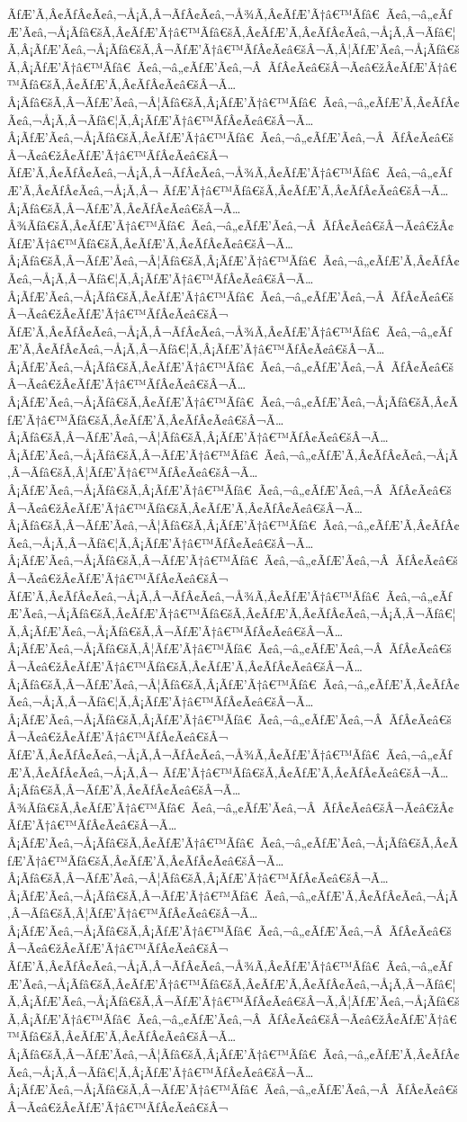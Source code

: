 \documentclass{gemoc} %
\begin{document}
ÃƒÆ’Ã‚Â¢ÃƒÂ¢Ã¢â‚¬Å¡Ã‚Â¬ÃƒÂ¢Ã¢â‚¬Å¾Ã‚Â¢ÃƒÆ’Ã†â€™Ãƒâ€ Ã¢â‚¬â„¢ÃƒÆ’Ã¢â‚¬Å¡Ãƒâ€šÃ‚Â¢ÃƒÆ’Ã†â€™Ãƒâ€šÃ‚Â¢ÃƒÆ’Ã‚Â¢ÃƒÂ¢Ã¢â‚¬Å¡Ã‚Â¬Ãƒâ€¦Ã‚Â¡ÃƒÆ’Ã¢â‚¬Å¡Ãƒâ€šÃ‚Â¬ÃƒÆ’Ã†â€™ÃƒÂ¢Ã¢â€šÂ¬Ã‚Â¦ÃƒÆ’Ã¢â‚¬Å¡Ãƒâ€šÃ‚Â¡ÃƒÆ’Ã†â€™Ãƒâ€ Ã¢â‚¬â„¢ÃƒÆ’Ã¢â‚¬Â ÃƒÂ¢Ã¢â€šÂ¬Ã¢â€žÂ¢ÃƒÆ’Ã†â€™Ãƒâ€šÃ‚Â¢ÃƒÆ’Ã‚Â¢ÃƒÂ¢Ã¢â€šÂ¬Ã…Â¡Ãƒâ€šÃ‚Â¬ÃƒÆ’Ã¢â‚¬Â¦Ãƒâ€šÃ‚Â¡ÃƒÆ’Ã†â€™Ãƒâ€ Ã¢â‚¬â„¢ÃƒÆ’Ã‚Â¢ÃƒÂ¢Ã¢â‚¬Å¡Ã‚Â¬Ãƒâ€¦Ã‚Â¡ÃƒÆ’Ã†â€™ÃƒÂ¢Ã¢â€šÂ¬Ã…Â¡ÃƒÆ’Ã¢â‚¬Å¡Ãƒâ€šÃ‚Â¢ÃƒÆ’Ã†â€™Ãƒâ€ Ã¢â‚¬â„¢ÃƒÆ’Ã¢â‚¬Â ÃƒÂ¢Ã¢â€šÂ¬Ã¢â€žÂ¢ÃƒÆ’Ã†â€™ÃƒÂ¢Ã¢â€šÂ¬ ÃƒÆ’Ã‚Â¢ÃƒÂ¢Ã¢â‚¬Å¡Ã‚Â¬ÃƒÂ¢Ã¢â‚¬Å¾Ã‚Â¢ÃƒÆ’Ã†â€™Ãƒâ€ Ã¢â‚¬â„¢ÃƒÆ’Ã‚Â¢ÃƒÂ¢Ã¢â‚¬Å¡Ã‚Â¬ ÃƒÆ’Ã†â€™Ãƒâ€šÃ‚Â¢ÃƒÆ’Ã‚Â¢ÃƒÂ¢Ã¢â€šÂ¬Ã…Â¡Ãƒâ€šÃ‚Â¬ÃƒÆ’Ã‚Â¢ÃƒÂ¢Ã¢â€šÂ¬Ã…Â¾Ãƒâ€šÃ‚Â¢ÃƒÆ’Ã†â€™Ãƒâ€ Ã¢â‚¬â„¢ÃƒÆ’Ã¢â‚¬Â ÃƒÂ¢Ã¢â€šÂ¬Ã¢â€žÂ¢ÃƒÆ’Ã†â€™Ãƒâ€šÃ‚Â¢ÃƒÆ’Ã‚Â¢ÃƒÂ¢Ã¢â€šÂ¬Ã…Â¡Ãƒâ€šÃ‚Â¬ÃƒÆ’Ã¢â‚¬Â¦Ãƒâ€šÃ‚Â¡ÃƒÆ’Ã†â€™Ãƒâ€ Ã¢â‚¬â„¢ÃƒÆ’Ã‚Â¢ÃƒÂ¢Ã¢â‚¬Å¡Ã‚Â¬Ãƒâ€¦Ã‚Â¡ÃƒÆ’Ã†â€™ÃƒÂ¢Ã¢â€šÂ¬Ã…Â¡ÃƒÆ’Ã¢â‚¬Å¡Ãƒâ€šÃ‚Â¢ÃƒÆ’Ã†â€™Ãƒâ€ Ã¢â‚¬â„¢ÃƒÆ’Ã¢â‚¬Â ÃƒÂ¢Ã¢â€šÂ¬Ã¢â€žÂ¢ÃƒÆ’Ã†â€™ÃƒÂ¢Ã¢â€šÂ¬ ÃƒÆ’Ã‚Â¢ÃƒÂ¢Ã¢â‚¬Å¡Ã‚Â¬ÃƒÂ¢Ã¢â‚¬Å¾Ã‚Â¢ÃƒÆ’Ã†â€™Ãƒâ€ Ã¢â‚¬â„¢ÃƒÆ’Ã‚Â¢ÃƒÂ¢Ã¢â‚¬Å¡Ã‚Â¬Ãƒâ€¦Ã‚Â¡ÃƒÆ’Ã†â€™ÃƒÂ¢Ã¢â€šÂ¬Ã…Â¡ÃƒÆ’Ã¢â‚¬Å¡Ãƒâ€šÃ‚Â¢ÃƒÆ’Ã†â€™Ãƒâ€ Ã¢â‚¬â„¢ÃƒÆ’Ã¢â‚¬Â ÃƒÂ¢Ã¢â€šÂ¬Ã¢â€žÂ¢ÃƒÆ’Ã†â€™ÃƒÂ¢Ã¢â€šÂ¬Ã…Â¡ÃƒÆ’Ã¢â‚¬Å¡Ãƒâ€šÃ‚Â¢ÃƒÆ’Ã†â€™Ãƒâ€ Ã¢â‚¬â„¢ÃƒÆ’Ã¢â‚¬Å¡Ãƒâ€šÃ‚Â¢ÃƒÆ’Ã†â€™Ãƒâ€šÃ‚Â¢ÃƒÆ’Ã‚Â¢ÃƒÂ¢Ã¢â€šÂ¬Ã…Â¡Ãƒâ€šÃ‚Â¬ÃƒÆ’Ã¢â‚¬Â¦Ãƒâ€šÃ‚Â¡ÃƒÆ’Ã†â€™ÃƒÂ¢Ã¢â€šÂ¬Ã…Â¡ÃƒÆ’Ã¢â‚¬Å¡Ãƒâ€šÃ‚Â¬ÃƒÆ’Ã†â€™Ãƒâ€ Ã¢â‚¬â„¢ÃƒÆ’Ã‚Â¢ÃƒÂ¢Ã¢â‚¬Å¡Ã‚Â¬Ãƒâ€šÃ‚Â¦ÃƒÆ’Ã†â€™ÃƒÂ¢Ã¢â€šÂ¬Ã…Â¡ÃƒÆ’Ã¢â‚¬Å¡Ãƒâ€šÃ‚Â¡ÃƒÆ’Ã†â€™Ãƒâ€ Ã¢â‚¬â„¢ÃƒÆ’Ã¢â‚¬Â ÃƒÂ¢Ã¢â€šÂ¬Ã¢â€žÂ¢ÃƒÆ’Ã†â€™Ãƒâ€šÃ‚Â¢ÃƒÆ’Ã‚Â¢ÃƒÂ¢Ã¢â€šÂ¬Ã…Â¡Ãƒâ€šÃ‚Â¬ÃƒÆ’Ã¢â‚¬Â¦Ãƒâ€šÃ‚Â¡ÃƒÆ’Ã†â€™Ãƒâ€ Ã¢â‚¬â„¢ÃƒÆ’Ã‚Â¢ÃƒÂ¢Ã¢â‚¬Å¡Ã‚Â¬Ãƒâ€¦Ã‚Â¡ÃƒÆ’Ã†â€™ÃƒÂ¢Ã¢â€šÂ¬Ã…Â¡ÃƒÆ’Ã¢â‚¬Å¡Ãƒâ€šÃ‚Â¬ÃƒÆ’Ã†â€™Ãƒâ€ Ã¢â‚¬â„¢ÃƒÆ’Ã¢â‚¬Â ÃƒÂ¢Ã¢â€šÂ¬Ã¢â€žÂ¢ÃƒÆ’Ã†â€™ÃƒÂ¢Ã¢â€šÂ¬ ÃƒÆ’Ã‚Â¢ÃƒÂ¢Ã¢â‚¬Å¡Ã‚Â¬ÃƒÂ¢Ã¢â‚¬Å¾Ã‚Â¢ÃƒÆ’Ã†â€™Ãƒâ€ Ã¢â‚¬â„¢ÃƒÆ’Ã¢â‚¬Å¡Ãƒâ€šÃ‚Â¢ÃƒÆ’Ã†â€™Ãƒâ€šÃ‚Â¢ÃƒÆ’Ã‚Â¢ÃƒÂ¢Ã¢â‚¬Å¡Ã‚Â¬Ãƒâ€¦Ã‚Â¡ÃƒÆ’Ã¢â‚¬Å¡Ãƒâ€šÃ‚Â¬ÃƒÆ’Ã†â€™ÃƒÂ¢Ã¢â€šÂ¬Ã…Â¡ÃƒÆ’Ã¢â‚¬Å¡Ãƒâ€šÃ‚Â¦ÃƒÆ’Ã†â€™Ãƒâ€ Ã¢â‚¬â„¢ÃƒÆ’Ã¢â‚¬Â ÃƒÂ¢Ã¢â€šÂ¬Ã¢â€žÂ¢ÃƒÆ’Ã†â€™Ãƒâ€šÃ‚Â¢ÃƒÆ’Ã‚Â¢ÃƒÂ¢Ã¢â€šÂ¬Ã…Â¡Ãƒâ€šÃ‚Â¬ÃƒÆ’Ã¢â‚¬Â¦Ãƒâ€šÃ‚Â¡ÃƒÆ’Ã†â€™Ãƒâ€ Ã¢â‚¬â„¢ÃƒÆ’Ã‚Â¢ÃƒÂ¢Ã¢â‚¬Å¡Ã‚Â¬Ãƒâ€¦Ã‚Â¡ÃƒÆ’Ã†â€™ÃƒÂ¢Ã¢â€šÂ¬Ã…Â¡ÃƒÆ’Ã¢â‚¬Å¡Ãƒâ€šÃ‚Â¡ÃƒÆ’Ã†â€™Ãƒâ€ Ã¢â‚¬â„¢ÃƒÆ’Ã¢â‚¬Â ÃƒÂ¢Ã¢â€šÂ¬Ã¢â€žÂ¢ÃƒÆ’Ã†â€™ÃƒÂ¢Ã¢â€šÂ¬ ÃƒÆ’Ã‚Â¢ÃƒÂ¢Ã¢â‚¬Å¡Ã‚Â¬ÃƒÂ¢Ã¢â‚¬Å¾Ã‚Â¢ÃƒÆ’Ã†â€™Ãƒâ€ Ã¢â‚¬â„¢ÃƒÆ’Ã‚Â¢ÃƒÂ¢Ã¢â‚¬Å¡Ã‚Â¬ ÃƒÆ’Ã†â€™Ãƒâ€šÃ‚Â¢ÃƒÆ’Ã‚Â¢ÃƒÂ¢Ã¢â€šÂ¬Ã…Â¡Ãƒâ€šÃ‚Â¬ÃƒÆ’Ã‚Â¢ÃƒÂ¢Ã¢â€šÂ¬Ã…Â¾Ãƒâ€šÃ‚Â¢ÃƒÆ’Ã†â€™Ãƒâ€ Ã¢â‚¬â„¢ÃƒÆ’Ã¢â‚¬Â ÃƒÂ¢Ã¢â€šÂ¬Ã¢â€žÂ¢ÃƒÆ’Ã†â€™ÃƒÂ¢Ã¢â€šÂ¬Ã…Â¡ÃƒÆ’Ã¢â‚¬Å¡Ãƒâ€šÃ‚Â¢ÃƒÆ’Ã†â€™Ãƒâ€ Ã¢â‚¬â„¢ÃƒÆ’Ã¢â‚¬Å¡Ãƒâ€šÃ‚Â¢ÃƒÆ’Ã†â€™Ãƒâ€šÃ‚Â¢ÃƒÆ’Ã‚Â¢ÃƒÂ¢Ã¢â€šÂ¬Ã…Â¡Ãƒâ€šÃ‚Â¬ÃƒÆ’Ã¢â‚¬Â¦Ãƒâ€šÃ‚Â¡ÃƒÆ’Ã†â€™ÃƒÂ¢Ã¢â€šÂ¬Ã…Â¡ÃƒÆ’Ã¢â‚¬Å¡Ãƒâ€šÃ‚Â¬ÃƒÆ’Ã†â€™Ãƒâ€ Ã¢â‚¬â„¢ÃƒÆ’Ã‚Â¢ÃƒÂ¢Ã¢â‚¬Å¡Ã‚Â¬Ãƒâ€šÃ‚Â¦ÃƒÆ’Ã†â€™ÃƒÂ¢Ã¢â€šÂ¬Ã…Â¡ÃƒÆ’Ã¢â‚¬Å¡Ãƒâ€šÃ‚Â¡ÃƒÆ’Ã†â€™Ãƒâ€ Ã¢â‚¬â„¢ÃƒÆ’Ã¢â‚¬Â ÃƒÂ¢Ã¢â€šÂ¬Ã¢â€žÂ¢ÃƒÆ’Ã†â€™ÃƒÂ¢Ã¢â€šÂ¬ ÃƒÆ’Ã‚Â¢ÃƒÂ¢Ã¢â‚¬Å¡Ã‚Â¬ÃƒÂ¢Ã¢â‚¬Å¾Ã‚Â¢ÃƒÆ’Ã†â€™Ãƒâ€ Ã¢â‚¬â„¢ÃƒÆ’Ã¢â‚¬Å¡Ãƒâ€šÃ‚Â¢ÃƒÆ’Ã†â€™Ãƒâ€šÃ‚Â¢ÃƒÆ’Ã‚Â¢ÃƒÂ¢Ã¢â‚¬Å¡Ã‚Â¬Ãƒâ€¦Ã‚Â¡ÃƒÆ’Ã¢â‚¬Å¡Ãƒâ€šÃ‚Â¬ÃƒÆ’Ã†â€™ÃƒÂ¢Ã¢â€šÂ¬Ã‚Â¦ÃƒÆ’Ã¢â‚¬Å¡Ãƒâ€šÃ‚Â¡ÃƒÆ’Ã†â€™Ãƒâ€ Ã¢â‚¬â„¢ÃƒÆ’Ã¢â‚¬Â ÃƒÂ¢Ã¢â€šÂ¬Ã¢â€žÂ¢ÃƒÆ’Ã†â€™Ãƒâ€šÃ‚Â¢ÃƒÆ’Ã‚Â¢ÃƒÂ¢Ã¢â€šÂ¬Ã…Â¡Ãƒâ€šÃ‚Â¬ÃƒÆ’Ã¢â‚¬Â¦Ãƒâ€šÃ‚Â¡ÃƒÆ’Ã†â€™Ãƒâ€ Ã¢â‚¬â„¢ÃƒÆ’Ã‚Â¢ÃƒÂ¢Ã¢â‚¬Å¡Ã‚Â¬Ãƒâ€¦Ã‚Â¡ÃƒÆ’Ã†â€™ÃƒÂ¢Ã¢â€šÂ¬Ã…Â¡ÃƒÆ’Ã¢â‚¬Å¡Ãƒâ€šÃ‚Â¬ÃƒÆ’Ã†â€™Ãƒâ€ Ã¢â‚¬â„¢ÃƒÆ’Ã¢â‚¬Â ÃƒÂ¢Ã¢â€šÂ¬Ã¢â€žÂ¢ÃƒÆ’Ã†â€™ÃƒÂ¢Ã¢â€šÂ¬ 
\end{document}
